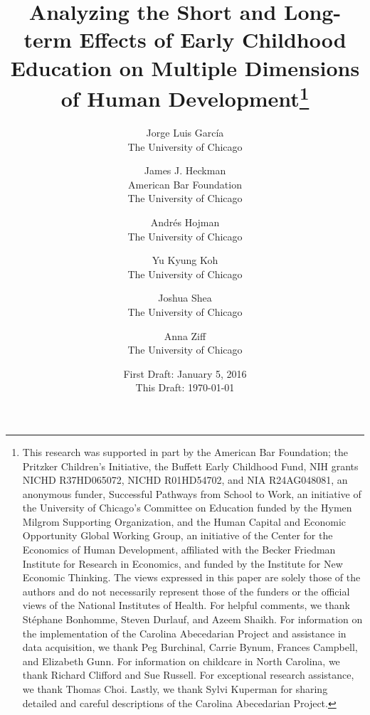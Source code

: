 




\title{\Large \textbf{Analyzing the Short and Long-term Effects of Early Childhood Education on Multiple Dimensions of Human Development}\thanks{This research was supported in part by the American Bar Foundation; the Pritzker Children's Initiative, the
Buffett Early Childhood Fund, NIH grants NICHD R37HD065072, NICHD R01HD54702, and NIA R24AG048081, an
anonymous funder, Successful Pathways from School to Work, an initiative of the University of Chicago's Committee
on Education funded by the Hymen Milgrom Supporting Organization, and the Human Capital and Economic
Opportunity Global Working Group, an initiative of the Center for the Economics of Human Development, affiliated with
the Becker Friedman Institute for Research in Economics, and funded by the Institute for New Economic Thinking. The
views expressed in this paper are solely those of the authors and do not necessarily represent those of the funders or
the official views of the National Institutes of Health. For helpful comments, we thank St\'{e}phane Bonhomme, Steven Durlauf, and Azeem Shaikh. For information on the implementation of the Carolina Abecedarian Project and assistance in data acquisition, we thank Peg Burchinal, Carrie Bynum, Frances Campbell, and Elizabeth Gunn. For information on childcare in North Carolina, we thank Richard Clifford and Sue Russell. For exceptional research assistance, we thank Thomas Choi. Lastly, we thank Sylvi Kuperman for sharing detailed and careful descriptions of the Carolina Abecedarian Project.}}

\author{
Jorge Luis Garc\'{i}a\\
The University of Chicago \and
James J. Heckman \\
American Bar Foundation \\
The University of Chicago \and
Andr\'{e}s Hojman\\
The University of Chicago \and
Yu Kyung Koh \\ 
The University of Chicago \and
Joshua Shea \\
The University of Chicago \and
Anna Ziff \\ 
The University of Chicago}
\date{First Draft: January 5, 2016\\ This Draft: \today}
\maketitle

